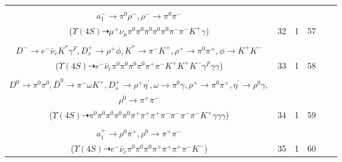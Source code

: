 \documentclass[landscape]{article}
\newcounter{rownumbers}
\newcommand\rn{\stepcounter{rownumbers}\arabic{rownumbers}}
\newcommand{\EOLP}{\\ \hline} %
\newcommand{\topoTags}[1]{#1} %
\begin{document}
\begin{longtable}{clcccc}
\rn & \makecell[l]{ $ 
\Upsilon(4S) \rightarrow B^{0} \bar{B}^{0} ,
B^{0} \rightarrow \mu^{+} \nu_{\mu} \pi^{-} \bar{D}^{*0} ,
\bar{B}^{0} \rightarrow \pi^{0} D^{0} ,
\bar{D}^{*0} \rightarrow \bar{D}^{0} \gamma ,
D^{0} \rightarrow \pi^{0} \pi^{0} ,
\bar{D}^{0} \rightarrow K^{+} a_{1}^{-} ,
$ \\ $
a_{1}^{-} \rightarrow \pi^{0} \rho^{-} ,
\rho^{-} \rightarrow \pi^{0} \pi^{-} 
$ \\ ($
\Upsilon(4S) \dashrightarrow \mu^{+} \nu_{\mu} \pi^{0} \pi^{0} \pi^{0} \pi^{0} \pi^{0} \pi^{-} \pi^{-} K^{+} \gamma 
$) } & \topoTags{32 & }1 & 57 \EOLP

\rn & \makecell[l]{ $ 
\Upsilon(4S) \rightarrow B^{0} \bar{B}^{0} ,
B^{0} \rightarrow D^{*-} D_{s}^{*+} ,
\bar{B}^{0} \rightarrow \pi^{0} D^{0} ,
D^{*-} \rightarrow D^{-} \gamma ,
D_{s}^{*+} \rightarrow D_{s}^{+} \gamma ,
D^{0} \rightarrow \pi^{0} \pi^{0} ,
$ \\ $
D^{-} \rightarrow e^{-} \bar{\nu}_{e} K^{*} \gamma^{F} ,
D_{s}^{+} \rightarrow \rho^{+} \phi ,
K^{*} \rightarrow \pi^{-} K^{+} ,
\rho^{+} \rightarrow \pi^{0} \pi^{+} ,
\phi \rightarrow K^{+} K^{-} 
$ \\ ($
\Upsilon(4S) \dashrightarrow e^{-} \bar{\nu}_{e} \pi^{0} \pi^{0} \pi^{0} \pi^{0} \pi^{+} \pi^{-} K^{+} K^{+} K^{-} \gamma^{F} \gamma \gamma 
$) } & \topoTags{33 & }1 & 58 \EOLP

\rn & \makecell[l]{ $ 
\Upsilon(4S) \rightarrow B^{0} \bar{B}^{0} ,
B^{0} \rightarrow \rho^{0} D^{*-} D_{s}^{*+} ,
\bar{B}^{0} \rightarrow \pi^{0} D^{0} ,
\rho^{0} \rightarrow \pi^{+} \pi^{-} ,
D^{*-} \rightarrow \pi^{-} \bar{D}^{0} ,
D_{s}^{*+} \rightarrow D_{s}^{+} \gamma ,
$ \\ $
D^{0} \rightarrow \pi^{0} \pi^{0} ,
\bar{D}^{0} \rightarrow \pi^{-} \omega K^{+} ,
D_{s}^{+} \rightarrow \rho^{+} \eta^{\prime} ,
\omega \rightarrow \pi^{0} \gamma ,
\rho^{+} \rightarrow \pi^{0} \pi^{+} ,
\eta^{\prime} \rightarrow \rho^{0} \gamma ,
$ \\ $
\rho^{0} \rightarrow \pi^{+} \pi^{-} 
$ \\ ($
\Upsilon(4S) \dashrightarrow \pi^{0} \pi^{0} \pi^{0} \pi^{0} \pi^{0} \pi^{+} \pi^{+} \pi^{+} \pi^{-} \pi^{-} \pi^{-} \pi^{-} K^{+} \gamma \gamma \gamma 
$) } & \topoTags{34 & }1 & 59 \EOLP

\rn & \makecell[l]{ $ 
\Upsilon(4S) \rightarrow \bar{B}^{0} \bar{B}^{0} ,
\bar{B}^{0} \rightarrow \pi^{0} D^{0} ,
\bar{B}^{0} \rightarrow e^{-} \bar{\nu}_{e} D^{*+} ,
D^{0} \rightarrow \pi^{0} \pi^{0} ,
D^{*+} \rightarrow \pi^{+} D^{0} ,
D^{0} \rightarrow K^{-} a_{1}^{+} ,
$ \\ $
a_{1}^{+} \rightarrow \rho^{0} \pi^{+} ,
\rho^{0} \rightarrow \pi^{+} \pi^{-} 
$ \\ ($
\Upsilon(4S) \dashrightarrow e^{-} \bar{\nu}_{e} \pi^{0} \pi^{0} \pi^{0} \pi^{+} \pi^{+} \pi^{+} \pi^{-} K^{-} 
$) } & \topoTags{35 & }1 & 60 \EOLP


\end{longtable}
\end{document}

